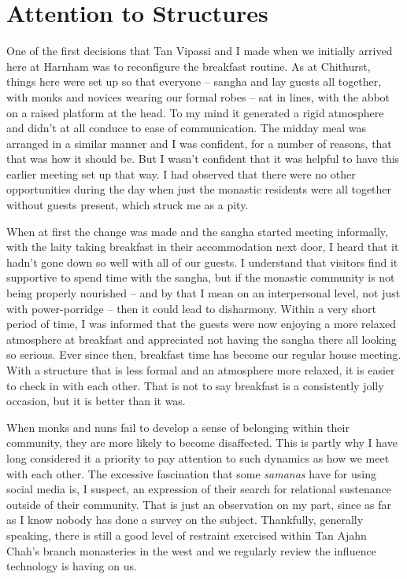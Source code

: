 \section{Attention to Structures}

One of the first decisions that Tan Vipassi and I made when we initially
arrived here at Harnham was to reconfigure the breakfast routine. As at
Chithurst, things here were set up so that everyone -- sangha and lay
guests all together, with monks and novices wearing our formal robes --
sat in lines, with the abbot on a raised platform at the head. To my
mind it generated a rigid atmosphere and didn't at all conduce to ease
of communication. The midday meal was arranged in a similar manner and I
was confident, for a number of reasons, that that was how it should be.
But I wasn't confident that it was helpful to have this earlier meeting
set up that way. I had observed that there were no other opportunities
during the day when just the monastic residents were all together
without guests present, which struck me as a pity.

When at first the change was made and the sangha started meeting
informally, with the laity taking breakfast in their accommodation next
door, I heard that it hadn't gone down so well with all of our guests. I
understand that visitors find it supportive to spend time with the
sangha, but if the monastic community is not being properly nourished --
and by that I mean on an interpersonal level,
not just with power-porridge\cite{porridge}
-- then it could lead to disharmony. Within a very short
period of time, I was informed that the guests were now enjoying a more
relaxed atmosphere at breakfast and appreciated not having the sangha
there all looking so serious. Ever since then, breakfast time has become
our regular house meeting. With a structure that is less formal and an
atmosphere more relaxed, it is easier to check in with each other. That
is not to say breakfast is a consistently jolly occasion, but it is
better than it was.

When monks and nuns fail to develop a sense of belonging within their
community, they are more likely to become disaffected. This is partly
why I have long considered it a priority to pay attention to such
dynamics as how we meet with each other. The excessive fascination that
some \emph{samanas} have for using social media is, I suspect, an
expression of their search for relational sustenance outside of their
community. That is just an observation on my part, since as far as I
know nobody has done a survey on the subject. Thankfully, generally
speaking, there is still a good level of restraint exercised within Tan
Ajahn Chah's branch monasteries in the west and we regularly review the
influence technology is having on us.

